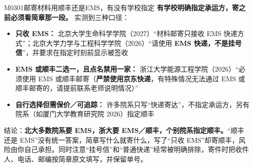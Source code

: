 \begin{qa}{M0301}{邮寄材料用顺丰还是EMS，有没有学校指定}
\textbf{有学校明确指定承运方，寄之前必须看简章那一段。} 实测到三种口径：

\begin{itemize}
  \item \textbf{只收 EMS：} 北京大学生命科学学院（2027）“材料邮寄只接收 EMS 快递方式”；北京大学力学与工程科学学院（2026）“请使用 \textbf{EMS 快递，不是挂号信}”，并要求在指定时刻前显示被签收
  \item \textbf{EMS 或顺丰二选一，且点名禁用一家：} 浙江大学能源工程学院（2026）“必须使用 EMS 或顺丰邮寄（\textbf{严禁使用京东快递}，有特殊情况无法通过 EMS 或顺丰邮寄的，请提前联系老师说明情况）”
  \item \textbf{自行选择但需保价／可追踪：} 许多院系只写“快递寄达”，不指定承运方，另有院系（如厦门大学教育研究院 2026）指定顺丰
\end{itemize}

结论：\textbf{北大多数院系要 EMS，浙大要 EMS／顺丰，个别院系指定顺丰。}“顺丰还是 EMS”没有统一答案，简章写什么就寄什么，写了“只收 EMS”却寄顺丰，风险由你自己承担。同时注意“挂号信”和“普通快递”经常被明确排除，寄件时把收件人、电话、邮编按简章原文填写，并保留单号。
\end{qa}


